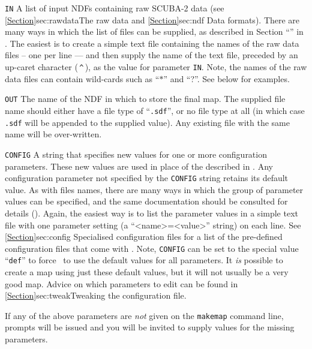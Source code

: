 \begin{aligndesc}
\item[\texttt{IN}] A list of input NDFs containing raw SCUBA-2 data (see
\cref{Section}{sec:rawdata}{The raw data} and \cref{Section}{sec:ndf}
{Data formats}). There are many ways in which the list of files can be supplied,
as described in Section ``''
in . The easiest is to create a simple text
file containing the names of the raw data files -- one per line --- and
then supply the name of the text file, preceded by an up-caret character
(\,\texttt{\^{}}\,), as the value for parameter \texttt{IN}. Note, the names of
the raw data files can contain wild-cards such as ``$*$'' and ``?''. 
See below for examples.

\item[\texttt{OUT}] The name of the NDF in which to store the final
map. The supplied file name should either have a file type of
``\texttt{.sdf}'', or no file type at all (in which case \texttt{.sdf}
will be appended to the supplied value). Any existing file with the same
name will be over-written.

\item[\texttt{CONFIG}] A string that specifies new values for one or more
configuration parameters. These new values are used in place of the
 described in
. Any configuration parameter not specified by
the \texttt{CONFIG} string retains its default value. As with files
names, there are many ways in which the group of parameter values can be
specified, and the same documentation should be consulted for details
(). Again, the easiest way is to list the
parameter values in a simple text file with one parameter setting (a
``<name>=<value>'' string) on each line. See \cref{Section}{sec:config}
{Specialised configuration files} for a list of the pre-defined
configuration files that come with \smurf. Note, \texttt{CONFIG}
can be set to the special value ``\texttt{def}'' to force \makemap\ to
use the default values for all parameters. It \emph{is} possible to create
a map using just these default values, but it will not usually be a very
good map. Advice on which parameters to edit can be found in
\cref{Section}{sec:tweak}{Tweaking the configuration file}.

\end{aligndesc}

If any of the above parameters are \emph{not} given on the \texttt{makemap}
command line, prompts will be issued and you will be invited to supply values
for the missing parameters.

